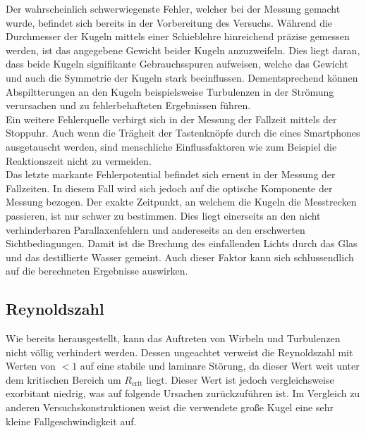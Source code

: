 Der wahrscheinlich schwerwiegenste Fehler, welcher bei der Messung gemacht wurde, befindet sich bereits in der Vorbereitung des 
Versuchs. Während die Durchmesser der Kugeln mittels einer Schieblehre hinreichend präzise gemessen werden, ist das angegebene 
Gewicht beider Kugeln anzuzweifeln. Dies liegt daran, dass beide Kugeln signifikante Gebrauchsspuren aufweisen, welche das Gewicht 
und auch die Symmetrie der Kugeln stark beeinflussen. Dementsprechend können Abspiltterungen an den Kugeln beispielsweise Turbulenzen
in der Strömung verursachen und zu fehlerbehafteten Ergebnissen führen.\\
Ein weitere Fehlerquelle verbirgt sich in der Messung der Fallzeit mittels der Stoppuhr. Auch wenn die Trägheit der Tastenknöpfe durch 
die eines Smartphones ausgetauscht werden, sind menschliche Einflussfaktoren wie zum Beispiel die Reaktionszeit nicht zu vermeiden.\\
Das letzte markante Fehlerpotential befindet sich erneut in der Messung der Fallzeiten. In diesem Fall wird sich jedoch auf die 
optische Komponente der Messung bezogen. Der exakte Zeitpunkt, an welchem die Kugeln die Messtrecken passieren, ist nur schwer zu 
bestimmen. Dies liegt einerseits an den nicht verhinderbaren Parallaxenfehlern und andereseits an den erschwerten Sichtbedingungen.
Damit ist die Brechung des einfallenden Lichts durch das Glas und das destillierte Wasser gemeint. Auch dieser Faktor kann sich 
schlussendlich auf die berechneten Ergebnisse auswirken.

\subsection{Reynoldszahl}

Wie bereits herausgestellt, kann das Auftreten von Wirbeln und Turbulenzen nicht völlig verhindert werden. Dessen ungeachtet 
verweist die Reynoldszahl mit Werten von $< 1$ auf eine stabile und laminare Störung, da dieser Wert weit unter dem kritischen 
Bereich um $R_\text{crit}$ liegt. Dieser Wert ist jedoch vergleichsweise exorbitant niedrig, was auf folgende Ursachen zurückzuführen ist.
Im Vergleich zu anderen Versuchskonstruktionen weist die verwendete große Kugel eine sehr kleine Fallgeschwindigkeit auf.

